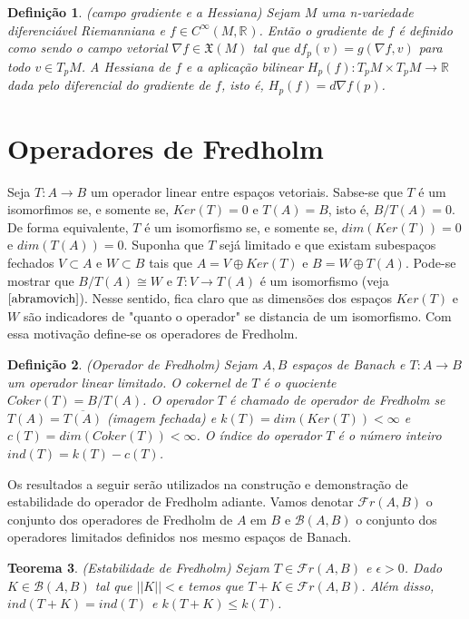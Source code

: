 \documentclass[12pt]{book}
\newtheorem{teorema}{Teorema}[section]
\newtheorem{definicao}[teorema]{Definição}
\newcommand{\campossuaves}[1]{\mathfrak{X}(#1)}
\newcommand{\funcoessuaves}[1]{C^{\infty}(#1, \real{})}
\newcommand{\gradiente}{\nabla f}
\newcommand{\operadoresfredholm}[2]{\mathcal{F}r(#1, #2)}
\newcommand{\operadoreslimitados}[2]{\mathcal{B}(#1, #2)}
\newcommand{\real}[1]{\mathbb{R}^{#1}}
\newcommand{\reta}{\real{}}
\begin{document}
	\begin{definicao}\label{definicao_gradiente_hessiana}
		(campo gradiente e a Hessiana) Sejam $M$ uma n-variedade diferenciável Riemanniana e $f\in \funcoessuaves{M}$. Então o gradiente de $f$ é definido como sendo o campo vetorial $\gradiente \in \campossuaves{M}$ tal que $df_{p}(v) = g(\gradiente, v)$ para todo $v \in T_{p}M$. A Hessiana de $f$ e a aplicação bilinear $H_{p}(f): T_{p}M\times T_{p}M \to \reta$ dada pelo diferencial do gradiente de $f$, isto é, $H_{p}(f) = d\gradiente(p)$.
	\end{definicao}
	
	\section{Operadores de Fredholm}
	Seja $T:A\to B$ um operador linear entre espaços vetoriais. Sabse-se que $T$ é um isomorfimos se, e somente se, $Ker(T) = 0$ e $T(A) = B$, isto é, $B/T(A) = 0$. De forma equivalente, $T$ é um isomorfismo se, e somente se, $dim(Ker(T)) = 0$ e $dim(T(A)) = 0$. Suponha que $T$ sejá limitado e que existam subespaços fechados $V \subset A$ e $W \subset B$ tais que $A=V\oplus Ker(T)$ e $B=W\oplus T(A)$. Pode-se mostrar que $B/T(A) \cong W$ e $T:V \to T(A)$ é um isomorfismo (veja $\cite{abramovich}$). Nesse sentido, fica claro que as dimensões dos espaços $Ker(T)$ e $W$ são indicadores de "quanto o operador" se distancia de um isomorfismo. Com essa motivação define-se os operadores de Fredholm.
	
	
	\begin{definicao}\label{definicao_oeprador_fredholm}
		(Operador de Fredholm) Sejam $A, B$ espaços de Banach e $T: A\to B$ um operador linear limitado. O cokernel de $T$ é o quociente $Coker(T)=B/T(A)$. O operador $T$ é chamado de operador de Fredholm se $T(A)=\overline{T(A)}$ (imagem fechada) e $k(T) = dim(Ker(T)) < \infty$ e $c(T)=dim(Coker(T)) < \infty$. O índice do operador $T$ é o número inteiro $ind(T) = k(T) - c(T)$. 
	\end{definicao}
	
	Os resultados a seguir serão utilizados na construção e demonstração de estabilidade do operador de Fredholm adiante. Vamos denotar $\operadoresfredholm{A}{B}$ o conjunto dos operadores de Fredholm de $A$ em $B$ e $\operadoreslimitados{A}{B}$ o conjunto dos operadores limitados definidos nos mesmo espaços de Banach.
	
	\begin{teorema}\label{teorema_estabilidade_fredholm}
		(Estabilidade de Fredholm) Sejam  $T \in \operadoresfredholm{A}{B}$ e $\epsilon>0$. Dado $K \in \operadoreslimitados{A}{B}$ tal que $||K|| < \epsilon$ temos que $T+K \in \operadoresfredholm{A}{B}$. Além disso, $ind(T+K)=ind(T)$ e $k(T+K) \leq k(T)$.
	\end{teorema}
	
\end{document}
